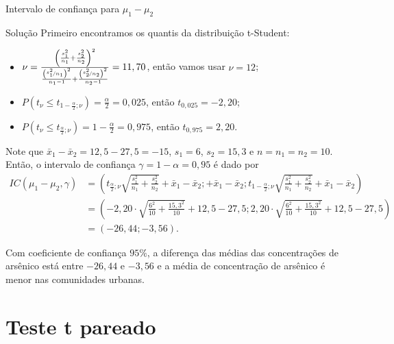 \documentclass[9pt]{beamer}
\begin{document}
\begin{frame}{Intervalo de confiança para $\mu_1 - \mu_2$}

\footnotesize
\begin{block}{Solução}
Primeiro encontramos os quantis da distribuição t-Student:
\begin{itemize}
\item $\nu = \frac{\left( \frac{s_1^2}{n_1} + \frac{s_2^2}{n_2} \right)^2}{\frac{\left(\nicefrac{s_1^2}{n_1}\right)^2}{n_1-1} + \frac{\left(\nicefrac{s_2^2}{n_2}\right)^2}{n_2-1}} = 11,70$, então vamos usar $\nu=12$;
\item $P(t_{\nu} \leq t_{1-\frac{\alpha}{2}; \nu}) = \frac{\alpha}{2} = 0,025$, então $t_{0,025} =-2,20$;
\item $P(t_{\nu} \leq t_{\frac{\alpha}{2}; \nu})  =1- \frac{\alpha}{2} = 0,975$, então $t_{0,975} =2,20$.
\end{itemize}	

Note que $\bar{x}_1-\bar{x}_2 = 12,5 - 27,5 = -15$, $s_1 =6$, $s_2 = 15,3$ e $n=n_1=n_2=10$. Então, o intervalo de confiança $\gamma=1-\alpha = 0,95$ é dado por
{\scriptsize
\begin{align*}
IC(\mu_1 - \mu_2, \gamma) &= \left( t_{\frac{\alpha}{2};\nu} \sqrt{\frac{s_1^2}{n_1} + \frac{s_2^2}{n_2}}   + \bar{x}_1- \bar{x}_2; + \bar{x}_1- \bar{x}_2; t_{1-\frac{\alpha}{2};\nu}  \sqrt{\frac{s_1^2}{n_1} + \frac{s_2^2}{n_2}} + \bar{x}_1- \bar{x}_2  \right)\\
&= \left( -2,20\cdot \sqrt{\frac{6^2}{10} + \frac{15,3^2}{10}} + 12,5 - 27,5; 2,20\cdot \sqrt{\frac{6^2}{10} + \frac{15,3^2}{10}} + 12,5 - 27,5  \right)\\
&= \left( -26,44; -3,56 \right).
\end{align*}
}

Com coeficiente de confiança $95\%$, a diferença das médias das concentrações de arsênico está entre $-26,44$ e $-3,56$ e  a média de concentração de arsênico é menor nas comunidades urbanas.
\end{block}
\normalsize

\end{frame}

\section{Teste t pareado}
\end{document}

